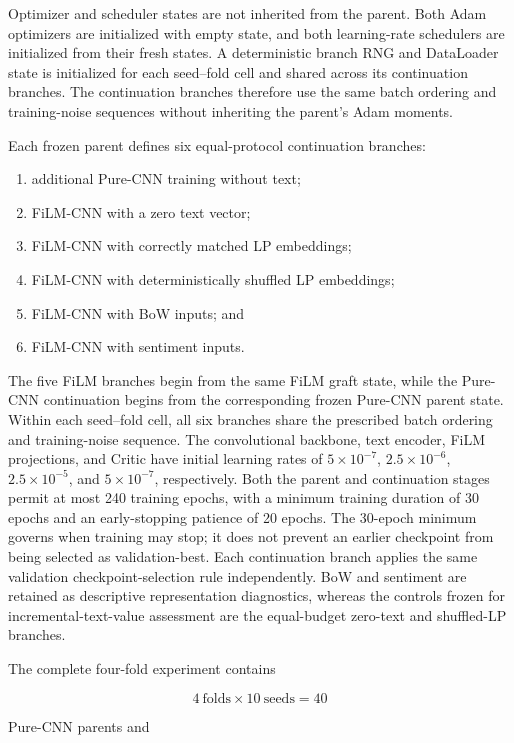 Optimizer and scheduler states are not inherited from the parent. Both Adam
optimizers are initialized with empty state, and both learning-rate schedulers
are initialized from their fresh states. A deterministic branch
RNG and DataLoader state is initialized for each seed--fold cell and shared
across its continuation branches. The continuation branches therefore use the same
batch ordering and training-noise sequences without inheriting the parent's
Adam moments.

Each frozen parent defines six equal-protocol continuation branches:

\begin{enumerate}
    \item additional Pure-CNN training without text;
    \item FiLM-CNN with a zero text vector;
    \item FiLM-CNN with correctly matched LP embeddings;
    \item FiLM-CNN with deterministically shuffled LP embeddings;
    \item FiLM-CNN with BoW inputs; and
    \item FiLM-CNN with sentiment inputs.
\end{enumerate}

The five FiLM branches begin from the same FiLM graft state, while the
Pure-CNN continuation begins from the corresponding frozen Pure-CNN parent
state. Within each seed--fold cell, all six branches share the prescribed
batch ordering and training-noise sequence. The convolutional backbone, text
encoder, FiLM projections, and Critic have initial learning rates of
$5\times10^{-7}$, $2.5\times10^{-6}$, $2.5\times10^{-5}$, and
$5\times10^{-7}$, respectively. Both the parent and continuation stages permit
at most 240 training epochs, with a minimum training duration of 30 epochs and
an early-stopping patience of 20 epochs. The 30-epoch minimum governs when
training may stop; it does not prevent an earlier checkpoint from being
selected as validation-best. Each continuation branch applies the same
validation checkpoint-selection rule independently. BoW and sentiment are
retained as descriptive representation diagnostics, whereas the controls
frozen for incremental-text-value assessment are the
equal-budget zero-text and shuffled-LP branches.

The complete four-fold experiment contains

\[
4\ \text{folds}\times10\ \text{seeds}=40
\]

Pure-CNN parents and

